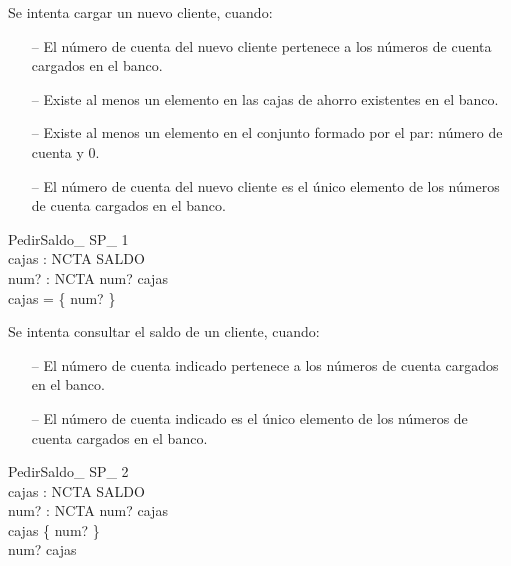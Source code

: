 \begin{tcolorbox}[colback=gray!5!white,colframe=gray!50!black,
  colbacktitle=gray!75!black,title=NuevoCliente\_SP\_12]
  Se intenta cargar un nuevo cliente, cuando:
     \begin{itemize}
        \item[--]{El número de cuenta del nuevo cliente pertenece a los números de cuenta cargados en el banco.}
        \item[--]{Existe al menos un elemento en las cajas de ahorro existentes en el banco.}
        \item[--]{Existe al menos un elemento en el conjunto formado por el par: número de cuenta y 0.}
        \item[--]{El número de cuenta del nuevo cliente es el único elemento de los números de cuenta cargados en el banco.}
     \end{itemize}
\end{tcolorbox}


\begin{schema}{PedirSaldo\_ SP\_ 1}\\
 cajas : NCTA \pfun SALDO \\
 num? : NCTA 
\where
 num? \in \dom cajas \\
 \dom cajas = \{ num? \}
\end{schema}

\begin{tcolorbox}[colback=gray!5!white,colframe=gray!50!black,
  colbacktitle=gray!75!black,title=PedirSaldo\_SP\_1]
  Se intenta consultar el saldo de un cliente, cuando:
     \begin{itemize}
        \item[--]{El número de cuenta indicado pertenece a los números de cuenta cargados en el banco.}
        \item[--]{El número de cuenta indicado es el único elemento de los números de cuenta cargados en el banco.}
     \end{itemize}
\end{tcolorbox}


\begin{schema}{PedirSaldo\_ SP\_ 2}\\
 cajas : NCTA \pfun SALDO \\
 num? : NCTA 
\where
 num? \in \dom cajas \\
 \dom cajas \neq \{ num? \} \\
 num? \in \dom cajas
\end{schema}

